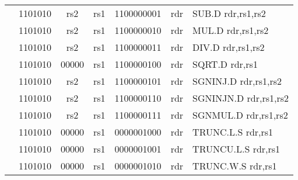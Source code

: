 \begin{table}[p]
\begin{small}
\begin{center}
\begin{tabular}{rcccccccccl}
&
\multicolumn{2}{|c|}{1101010} &
\multicolumn{1}{c|}{rs2} &
\multicolumn{1}{c|}{rs1} &
\multicolumn{4}{c|}{1100000001} &
\multicolumn{1}{c|}{rdr} & SUB.D rdr,rs1,rs2 \\
\cline{2-10}
  

&
\multicolumn{2}{|c|}{1101010} &
\multicolumn{1}{c|}{rs2} &
\multicolumn{1}{c|}{rs1} &
\multicolumn{4}{c|}{1100000010} &
\multicolumn{1}{c|}{rdr} & MUL.D rdr,rs1,rs2 \\
\cline{2-10}
  

&
\multicolumn{2}{|c|}{1101010} &
\multicolumn{1}{c|}{rs2} &
\multicolumn{1}{c|}{rs1} &
\multicolumn{4}{c|}{1100000011} &
\multicolumn{1}{c|}{rdr} & DIV.D rdr,rs1,rs2 \\
\cline{2-10}
  

&
\multicolumn{2}{|c|}{1101010} &
\multicolumn{1}{c|}{00000} &
\multicolumn{1}{c|}{rs1} &
\multicolumn{4}{c|}{1100000100} &
\multicolumn{1}{c|}{rdr} & SQRT.D rdr,rs1 \\
\cline{2-10}
  

&
\multicolumn{2}{|c|}{1101010} &
\multicolumn{1}{c|}{rs2} &
\multicolumn{1}{c|}{rs1} &
\multicolumn{4}{c|}{1100000101} &
\multicolumn{1}{c|}{rdr} & SGNINJ.D rdr,rs1,rs2 \\
\cline{2-10}
  

&
\multicolumn{2}{|c|}{1101010} &
\multicolumn{1}{c|}{rs2} &
\multicolumn{1}{c|}{rs1} &
\multicolumn{4}{c|}{1100000110} &
\multicolumn{1}{c|}{rdr} & SGNINJN.D rdr,rs1,rs2 \\
\cline{2-10}
  

&
\multicolumn{2}{|c|}{1101010} &
\multicolumn{1}{c|}{rs2} &
\multicolumn{1}{c|}{rs1} &
\multicolumn{4}{c|}{1100000111} &
\multicolumn{1}{c|}{rdr} & SGNMUL.D rdr,rs1,rs2 \\
\cline{2-10}
  

&
\multicolumn{2}{|c|}{1101010} &
\multicolumn{1}{c|}{00000} &
\multicolumn{1}{c|}{rs1} &
\multicolumn{4}{c|}{0000001000} &
\multicolumn{1}{c|}{rdr} & TRUNC.L.S rdr,rs1 \\
\cline{2-10}
  

&
\multicolumn{2}{|c|}{1101010} &
\multicolumn{1}{c|}{00000} &
\multicolumn{1}{c|}{rs1} &
\multicolumn{4}{c|}{0000001001} &
\multicolumn{1}{c|}{rdr} & TRUNCU.L.S rdr,rs1 \\
\cline{2-10}
  

&
\multicolumn{2}{|c|}{1101010} &
\multicolumn{1}{c|}{00000} &
\multicolumn{1}{c|}{rs1} &
\multicolumn{4}{c|}{0000001010} &
\multicolumn{1}{c|}{rdr} & TRUNC.W.S rdr,rs1 \\
\cline{2-10}
  


\end{tabular}
\end{center}
\end{small}
\end{table}
